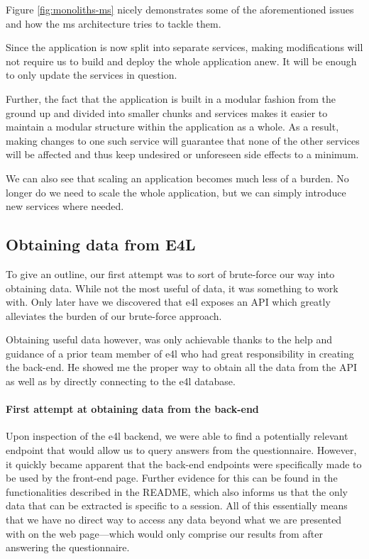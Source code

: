 Figure \ref{fig:monoliths-ms} nicely demonstrates some of the
aforementioned issues and how the \gls{ms} architecture tries to
tackle them.

Since the application is now split into separate services, making
modifications will not require us to build and deploy the whole
application anew. It will be enough to only update the services in
question.

Further, the fact that the application is built in a modular fashion
from the ground up and divided into smaller chunks and services makes
it easier to maintain a modular structure within the application as a
whole. As a result, making changes to one such service will guarantee
that none of the other services will be affected and thus keep
undesired or unforeseen side effects to a minimum.

We can also see that scaling an application becomes much less of a
burden. No longer do we need to scale the whole application, but we
can simply introduce new services where needed.


\subsection{Obtaining data from E4L}
\label{app:e4l-data}

To give an outline, our first attempt was to sort of brute-force our
way into obtaining data. While not the most useful of data, it was
something to work with. Only later have we discovered that \gls{e4l}
exposes an API which greatly alleviates the burden of our brute-force
approach.

Obtaining useful data however, was only achievable thanks to the help
and guidance of a prior team member of \gls{e4l} who had great
responsibility in creating the back-end. He showed me the proper way to
obtain all the data from the API as well as by directly connecting to
the \gls{e4l} database.

\paragraph{First attempt at obtaining data from the back-end}

Upon inspection of the \gls{e4l} backend, we were able to find a
potentially relevant endpoint that would allow us to query answers
from the questionnaire.  However, it quickly became apparent that the
back-end endpoints were specifically made to be used by the front-end
page. Further evidence for this can be found in the functionalities
described in the README, which also informs us that the only data that
can be extracted is specific to a session. All of this essentially
means that we have no direct way to access any data beyond what we are
presented with on the web page---which would only comprise our results
from after answering the questionnaire.

